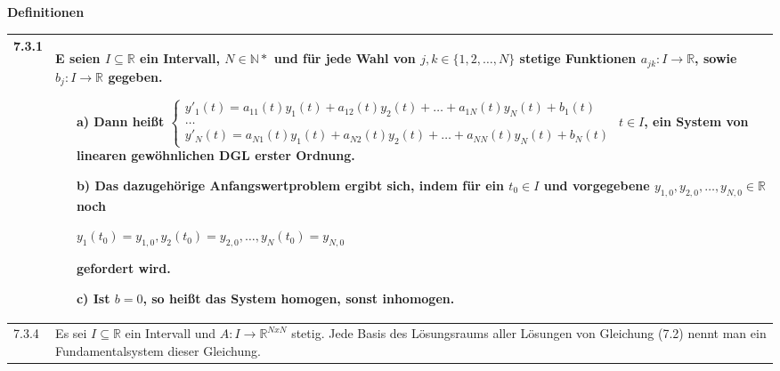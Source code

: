    \noindent
    \textbf{Definitionen}
    \begin{table}[H]  
    \begin{tabularx}{\textwidth}{X m{16cm}}
        \toprule

        7.3.1 & E seien $I \subseteq  \mathbb{R}$ ein Intervall, $N \in \mathbb{N*}$ und für jede Wahl von $j,k \in \{1,2,\dots,N\}$ 
            stetige Funktionen $a_{jk}: I \rightarrow \mathbb{R}$, sowie $b_j: I \rightarrow \mathbb{R}$ gegeben. 
            \begin{itemize}[topsep=-0.5cm]
                \item[a)] Dann heißt \hfill \break
                            $\begin{cases}
                                y'_1(t) = a_{11}(t)y_1(t) + a_{12}(t)y_2(t) + \dots + a_{1N}(t)y_N(t) + b_1(t) \\
                                \dots \\
                                y'_N(t) = a_{N1}(t)y_1(t) + a_{N2}(t) y_2(t) + \dots + a_{NN}(t)y_N(t) + b_N(t)
                            \end{cases}$
                            $t\in I$, ein \textbf{System von linearen gewöhnlichen DGL erster Ordnung.}
                \item[b)] Das dazugehörige Anfangswertproblem ergibt sich, indem für ein $t_0 \in I$ und vorgegebene
                            $y_{1,0},y_{2,0},\dots,y_{N,0} \in \mathbb{R}$ noch \hfill \break
                            \centerline{$ y_1(t_0) = y_{1,0}, y_2(t_0) = y_{2,0}, \dots, y_N(t_0)=y_{N,0} $}
                            gefordert wird.
                \item[c)] Ist $b= 0$, so heißt das System homogen, sonst inhomogen.
            \end{itemize} \vspace{-0cm} \\
        \midrule
        7.3.4 & Es sei $I \subseteq \mathbb{R}$ ein Intervall und $A:I \rightarrow \mathbb{R}^{NxN}$ stetig. Jede Basis des Lösungsraums aller
                Lösungen von Gleichung (7.2) nennt man ein Fundamentalsystem dieser Gleichung. \\

        \bottomrule

    \end{tabularx}
    \end{table}

